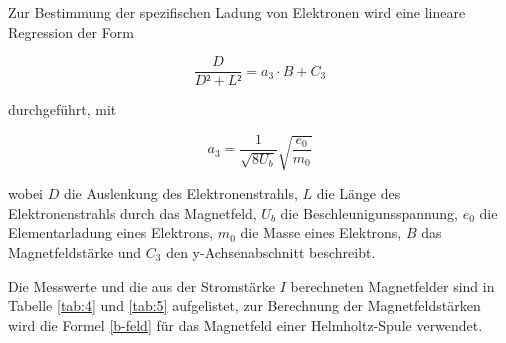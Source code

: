 Zur Bestimmung der spezifischen Ladung von Elektronen wird eine lineare Regression der Form

\begin{equation*}
  \frac{D}{D²+L²} = a_3 \cdot B + C_3
\end{equation*}

durchgeführt, mit

\begin{equation}
  a_3 = \frac{1}{\sqrt{8 U_b}} \sqrt{\frac{e_0}{m_0}}
\end{equation}

wobei $D$ die Auslenkung des Elektronenstrahls, $L$ die Länge des Elektronenstrahls durch das Magnetfeld, $U_b$ die Beschleunigunsspannung,
$e_0$ die Elementarladung eines Elektrons, $m_0$ die Masse eines Elektrons, $B$ das Magnetfeldstärke und $C_3$ den y-Achsenabschnitt beschreibt.

Die Messwerte und die aus der Stromstärke $I$ berechneten Magnetfelder sind in Tabelle \ref{tab:4} und \ref{tab:5} aufgelistet, zur Berechnung der Magnetfeldstärken
wird die Formel \eqref{b-feld} für das Magnetfeld einer Helmholtz-Spule verwendet.

